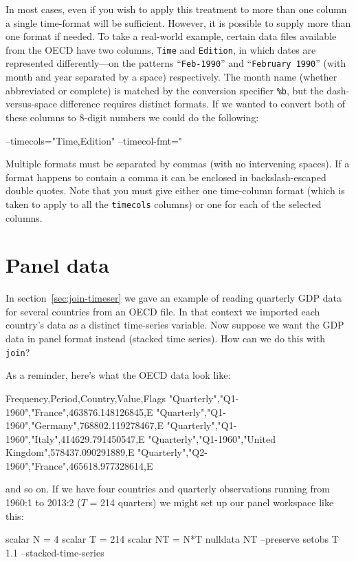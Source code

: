 In most cases, even if you wish to apply this treatment to more than
one column a single time-format will be sufficient. However, it is
possible to supply more than one format if needed. To take a
real-world example, certain data files available from the OECD have
two columns, \texttt{Time} and \texttt{Edition}, in which dates are
represented differently---on the patterns ``\texttt{Feb-1990}'' and
``\texttt{February 1990}'' (with month and year separated by a space)
respectively. The month name (whether abbreviated or complete) is
matched by the conversion specifier \texttt{\%b}, but the
dash-versus-space difference requires distinct formats. If we wanted
to convert both of these columns to 8-digit numbers we could do the
following:
\begin{code}
--timecols="Time,Edition"
--timecol-fmt="%
\end{code}

Multiple formats must be separated by commas (with no intervening
spaces). If a format happens to contain a comma it can be enclosed in
backslash-escaped double quotes. Note that you must give either one
time-column format (which is taken to apply to all the
\texttt{timecols} columns) or one for each of the selected columns.

\section{Panel data}
\label{sec:join-panel}

In section~\ref{sec:join-timeser} we gave an example of reading
quarterly GDP data for several countries from an OECD file. In that
context we imported each country's data as a distinct time-series
variable. Now suppose we want the GDP data in panel format instead
(stacked time series). How can we do this with \texttt{join}? 

As a reminder, here's what the OECD data look like:
\begin{code}
Frequency,Period,Country,Value,Flags
"Quarterly","Q1-1960","France",463876.148126845,E
"Quarterly","Q1-1960","Germany",768802.119278467,E
"Quarterly","Q1-1960","Italy",414629.791450547,E
"Quarterly","Q1-1960","United Kingdom",578437.090291889,E
"Quarterly","Q2-1960","France",465618.977328614,E
\end{code}
and so on. If we have four countries and quarterly observations
running from 1960:1 to 2013:2 ($T$ = 214 quarters) we might set up our
panel workspace like this:
\begin{code}
scalar N = 4
scalar T = 214
scalar NT = N*T
nulldata NT --preserve
setobs T 1.1 --stacked-time-series
\end{code}

